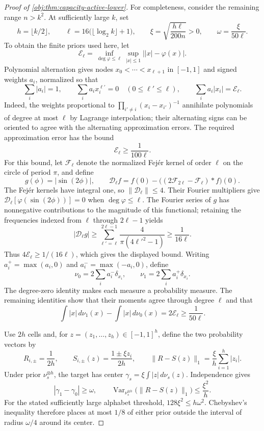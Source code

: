 \documentclass[11pt]{article}
\begin{document}
\begin{proof}[Proof of \cref{obj:thm:capacity-active-lower}]
For completeness, consider the remaining range \(n>k^2\). At sufficiently large \(k\), set
\[
h=\lfloor k/2\rfloor,\qquad
\ell=16\bigl(\lfloor\log_2 k\rfloor+1\bigr),\qquad
\xi=\sqrt{\frac{h\ell}{200n}}>0,\qquad
\omega=\frac{\xi}{50\ell}.
\] %
To obtain the finite priors used here, let
\[
\mathcal E_\ell=\inf_{\deg\varphi\le\ell}\sup_{|x|\le1}\bigl||x|-\varphi(x)\bigr|.
\]
Polynomial alternation gives nodes \(x_0<\cdots<x_{\ell+1}\) in \([-1,1]\) and signed weights \(a_i\), normalized so that
\[
\sum_i|a_i|=1,\qquad
\sum_i a_i x_i^{\ell'}=0\quad(0\le\ell'\le\ell),\qquad
\sum_i a_i|x_i|=\mathcal E_\ell.
\]
Indeed, the weights proportional to \(\prod_{i'\ne i}(x_i-x_{i'})^{-1}\) annihilate polynomials of degree at most \(\ell\) by Lagrange interpolation; their alternating signs can be oriented to agree with the alternating approximation errors. The required approximation error has the bound
\[
\mathcal E_\ell\ge\frac1{100\ell}.
\]
For this bound, let \(\mathscr F_\ell\) denote the normalized Fejér kernel of order \(\ell\) on the circle of period \(\pi\), and define
\[
g(\phi)=|\sin(2\phi)|,\qquad
\mathscr D_\ell f=f(0)-\bigl((2\mathscr F_{2\ell}-\mathscr F_\ell)*f\bigr)(0).
\]
The Fejér kernels have integral one, so \(\|\mathscr D_\ell\|\le4\). Their Fourier multipliers give \(\mathscr D_\ell[\varphi(\sin(2\phi))]=0\) when \(\deg\varphi\le\ell\). The Fourier series of \(g\) has nonnegative contributions to the magnitude of this functional; retaining the frequencies indexed from \(\ell\) through \(2\ell-1\) yields
\[
|\mathscr D_\ell g|
\ge\sum_{\ell'=\ell}^{2\ell-1}
 \frac{4}{\pi(4{\ell'}^2-1)}
\ge\frac1{16\ell}.
\]
Thus \(4\mathcal E_\ell\ge1/(16\ell)\), which gives the displayed bound. Writing \(a_i^+=\max(a_i,0)\) and \(a_i^-=\max(-a_i,0)\), define
\[
\nu_0=2\sum_i a_i^-\delta_{x_i},\qquad
\nu_1=2\sum_i a_i^+\delta_{x_i}.
\]
The degree-zero identity makes each measure a probability measure. The remaining identities show that their moments agree through degree \(\ell\) and that
\[
\int|x|\,d\nu_1(x)-\int|x|\,d\nu_0(x)
=2\mathcal E_\ell\ge\frac1{50\ell}.
\] %

Use \(2h\) cells and, for \(z=(z_1,\ldots,z_h)\in[-1,1]^h\), define the two probability vectors by
\[
R_{i,\pm}=\frac1{2h},\qquad
S_{i,\pm}(z)=\frac{1\pm\xi z_i}{2h},
\qquad
\|R-S(z)\|_1=\frac{\xi}{h}\sum_{i=1}^h|z_i|.
\] %
Under prior \(\nu_s^{\otimes h}\), the target has center
\(\gamma_s=\xi\int|z|\,d\nu_s(z)\). Independence gives
\[
|\gamma_1-\gamma_0|\ge\omega,\qquad
\operatorname{Var}_{\nu_s^{\otimes h}}\!\bigl(\|R-S(z)\|_1\bigr)
\le\frac{\xi^2}{h}.
\] %
For the stated sufficiently large alphabet threshold, \(128\xi^2\le h\omega^2\). Chebyshev’s inequality therefore places at most \(1/8\) of either prior outside the interval of radius \(\omega/4\) around its center. %


\end{proof}
\end{document}
